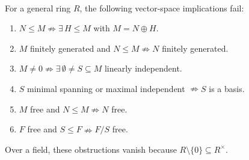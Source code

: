 \begin{principle} \label{princ:modules-not-vector-spaces} \\
For a general ring $R$, the following vector-space implications fail:
\begin{enumerate}[label=(\roman*)]
\setlength{\itemsep}{0pt}
\item $N\leq M\nRightarrow\exists\,H\leq M$ with $M=N\oplus H$.
\item $M$ finitely generated and $N\leq M\nRightarrow N$ finitely generated.
\item $M\neq0\nRightarrow\exists\,\emptyset\neq S\subseteq M$ linearly independent.
\item $S$ minimal spanning or maximal independent $\nRightarrow S$ is a basis.
\item $M$ free and $N\leq M\nRightarrow N$ free.
\item $F$ free and $S\leq F\nRightarrow F/S$ free.
\end{enumerate}
Over a field, these obstructions vanish because $R\setminus\{0\}\subseteq R^\times$.
\end{principle}
